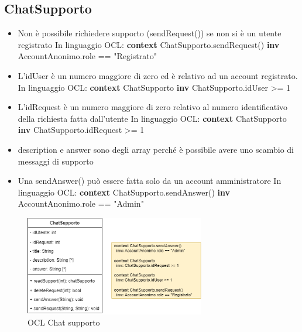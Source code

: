 \documentclass[a4paper,12pt]{article}
\begin{document}
\subsection{ChatSupporto}
\begin{itemize}
    \item Non è possibile richiedere supporto (sendRequest()) se non si è un utente registrato
    \newline \newline In linguaggio OCL:\newline
    \textbf{context} ChatSupporto.sendRequest() 
    \textbf{inv} AccountAnonimo.role == "Registrato"
    \item L'idUser è un numero maggiore di zero ed è relativo ad un account registrato. \newline \newline In linguaggio OCL:\newline
    \textbf{context} ChatSupporto
    \textbf{inv} ChatSupporto.idUser >= 1
    \item L'idRequest è un numero maggiore di zero relativo al numero identificativo della richiesta fatta dall'utente \newline \newline In linguaggio OCL:\newline
    \textbf{context} ChatSupporto
    \textbf{inv} ChatSupporto.idRequest >= 1
    \item description e answer sono degli array perché è possibile avere uno scambio di messaggi di supporto     
    \item  Una sendAnswer() può essere fatta solo da un account amministratore \newline \newline In linguaggio OCL:\newline
    \textbf{context} ChatSupporto.sendAnswer() 
    \textbf{inv} AccountAnonimo.role == "Admin"
\end{itemize}

\begin{figure}[H]
   \centering
   \includegraphics[width=0.7\textwidth] {D3/img/chat_supporto_OCL.png}
    \caption{OCL Chat supporto}
\end{figure}
\end{document}
